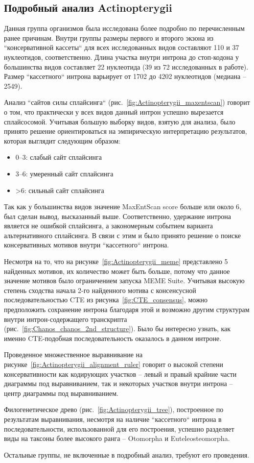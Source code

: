 \subsection{Подробный анализ Actinopterygii}

Данная группа организмов была исследована более подробно по перечисленным ранее причинам.
Внутри группы размеры первого и второго экзона из ``консервативной кассеты`` для всех исследованных видов составляют 110 и 37 нуклеотидов, соответственно.
Длина участка внутри интрона до стоп-кодона у большинства видов составляет 22 нуклеотида (39 из 72 исследованных в работе).
Размер ``кассетного`` интрона варьирует от 1702 до 4202 нуклеотидов (медиана – 2549).

Анализ ``сайтов силы сплайсинга`` (рис.~\ref{fig:Actinopterygii_maxentscan}) говорит о том, что практически у всех видов данный интрон успешно вырезается сплайсосомой.
Учитывая большую выборку видов, взятую для анализа, было принято решение ориентироваться на эмпирическую интерпретацию результатов, которая выглядит следующим образом:

\begin{spacing}{0.5}
\begin{itemize}
    \item 0–3: слабый сайт сплайсинга
    \item 3–6: умеренный сайт сплайсинга
    \item >6: сильный сайт сплайсинга
\end{itemize}
\end{spacing}

Так как у большинства видов значение MaxEntScan score больше или около 6, был сделан вывод, высказанный выше.
Соответственно, удержание интрона является не ошибкой сплайсинга, а закономерным событием варианта альтернативного сплайсинга.
В связи с этим и было принято решение о поиске консервативных мотивов внутри ``кассетного`` интрона.

Несмотря на то, что на рисунке~\ref{fig:Actinopterygii_meme} представлено 5 найденных мотивов, их количество может быть больше, потому что данное значение мотивов было ограничением запуска MEME Suite.
Учитывая высокую степень сходства начала 2-го найденного мотива с консенсусной последовательностью CTE из рисунка~\ref{fig:CTE_consensus}, можно предположить сохранение интрона благодаря этой и возможно другим структурам внутри интрон-содержащего транскрипта (рис.~\ref{fig:Chanos_chanos_2nd_structure}).
Было бы интересно узнать, как именно CTE-подобная последовательность оказалось в данном интроне.

Проведенное множественное выравнивание на рисунке~\ref{fig:Actinopterygii_alignment_ruler} говорит о высокой степени консервативности как кодирующих участков – левый и правый крайние части диаграммы под выравниванием, так и некоторых участков внутри интрона – центр диаграммы под выравниванием.

Филогенетическое древо (рис.~\ref{fig:Actinopterygii_tree}), построенное по результатам выравнивания, несмотря на наличие ``кассетного`` интрона в последовательности, использованной для его построения, успешно разделяет виды на таксоны более высокого ранга – Otomorpha и Euteleosteomorpha.

Остальные группы, не включенные в подробный анализ, требуют его проведения.